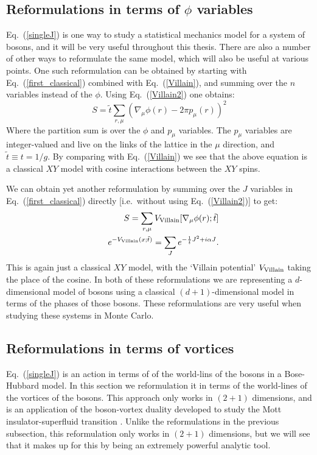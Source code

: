 \subsection{Reformulations in terms of $\phi$ variables}
Eq.~(\ref{singleJ}) is one way to study a statistical mechanics model for a system of bosons, and it will be very useful throughout this thesis. There are also a number of other ways to reformulate the same model, which will also be useful at various points. One such reformulation can be obtained by starting with Eq.~(\ref{first_classical}) combined with Eq.~(\ref{Villain}), and summing over the $n$ variables instead of the $\phi$. Using Eq.~(\ref{Villain2}) one obtains:
\begin{equation}
S=\tilde t \sum_{r,\mu} (\nabla_\mu \phi(r)-2\pi p_\mu(r))^2
\label{singleRods}
\end{equation}
Where the partition sum is over the $\phi$ and $p_\mu$ variables. The $p_\mu$ variables are integer-valued and live on the links of the lattice in the $\mu$ direction, and $\tilde t\equiv t=1/g$. By comparing with Eq.~(\ref{Villain}) we see that the above equation is a classical $XY$ model with cosine interactions between the $XY$ spins.

We can obtain yet another reformulation by summing over the $J$ variables in Eq.~(\ref{first_classical}) directly [i.e.~without using Eq.~(\ref{Villain2})] to get:
\begin{eqnarray}
&&S=\sum_{r,\mu} V_{\rm Villain} [\nabla_\mu \phi(r);\tilde t]\nonumber\\
&&e^{-V_{\rm Villain}(x;\tilde t)}=\sum_{J} e^{-\frac{1}{\tilde t} J^2+i\alpha J}.
\label{singleVillain}
\end{eqnarray}
This is again just a classical $XY$ model, with the `Villain potential' $V_{\rm Villain}$ taking the place of the cosine. In both of these reformulations we are representing a $d$-dimensional model of bosons using a classical $(d+1)$-dimensional model in terms of the phases of those bosons. These reformulations are very useful when studying these systems in Monte Carlo. 

\subsection{Reformulations in terms of vortices}
\label{subsec::JtoQ}
Eq.~(\ref{singleJ}) is an action in terms of of the world-lins of the bosons in a Bose-Hubbard model. In this section we reformulation it in terms of the world-lines of the vortices of the bosons. This approach only works in $(2+1)$ dimensions, and is an application of the boson-vortex duality developed to study the Mott insulator-superfluid transition\cite{PolyakovBook, Peskin1978, Dasgupta1981, FisherLee1989, LeeFisher1989, artphoton,short_range3} . Unlike the reformulations in the previous subsection, this reformulation only works in $(2+1)$ dimensions, but we will see that it makes up for this by being an extremely powerful analytic tool. 

